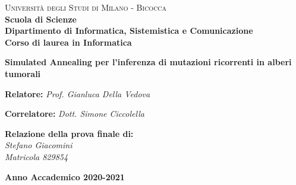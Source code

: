 \documentclass[12pt]{report}
\begin{document}
\captionsetup[table]{name=Figura}

\begin{titlepage}


  \noindent
  \begin{minipage}[t]{0.19\textwidth}
  \end{minipage}
  \begin{minipage}[t]{0.81\textwidth}
    {
      {\textsc{Università degli Studi di Milano - Bicocca}}\\
      \textbf{Scuola di Scienze}\\
      \textbf{Dipartimento di Informatica, Sistemistica e Comunicazione}\\
      \textbf{Corso di laurea in Informatica}\\
      \par
    }
  \end{minipage}

  \vspace{30mm}

  \begin{center}
    {\LARGE{
        \textbf{Simulated Annealing per l'inferenza di mutazioni ricorrenti in alberi tumorali}}}
  \end{center}

  \vspace{40mm}

  \noindent
  {\large \textbf{Relatore:} \textit{Prof. Gianluca Della Vedova} }

  \noindent
  {\large \textbf{Correlatore:} \textit{Dott. Simone Ciccolella}}

  \vspace{50mm}

  \begin{flushright}
    \textbf{\large Relazione della prova finale di:\\}
    \large{\textit{Stefano Giacomini}}\\
    \large{\textit{Matricola 829854}}
  \end{flushright}

  \vspace{40mm}
  \begin{center}
    {\large{\bf Anno Accademico 2020-2021}}
  \end{center}

  \restoregeometry

\end{titlepage}
\restoregeometry
\end{document}
